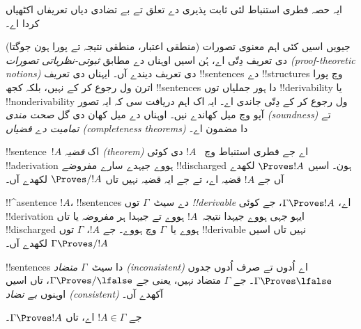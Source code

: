 \documentclass[../../../include/open-logic-section]{subfiles}
\begin{document}
      {}
      {}


\begin{editorial}
ایہ حصہ فطری استنباط لئی ثابت پذیری دے تعلق تے بے تضادی دیاں
تعریفاں اکٹھیاں کردا اے۔
\end{editorial}

\begin{explain}
جیویں اسیں کئی اہم معنوی تصورات (منطقی اعتبار، منطقی نتیجہ تے پورا ہون
جوگتا) دی تعریف دِتّی اے، ہُن اسیں اوہناں دے مطابق
\emph{ثبوتی-نظریاتی تصورات (proof-theoretic notions)} دی تعریف دیندے آں۔
ایہناں دی تعریف !!{sentence}s دے !!{structure}s وچ پورا اترن ول رجوع کر کے
نہیں، بلکہ کجھ !!{sentence}s دا ہور جملیاں توں !!{derivability}
یا !!{nonderivability} ول رجوع کر کے دِتّی جاندی اے۔ ایہ اک اہم دریافت سی
کہ ایہ تصور آپو وچ میل کھاندے نیں۔ اوہناں دے میل کھان دی گل
\emph{صحت مندی (soundness)} تے \emph{تمامیت دے قضیاں (completeness theorems)}
دا مضمون اے۔
\end{explain}


\begin{defn}
!!{sentence}~$!A$ اک \emph{قضیہ (theorem)} اے جے فطری استنباط وچ
~$!A$ دی کوئی !!a{derivation} ہووے جیہدے سارے مفروضے !!{discharged} ہون۔
اسیں $\Proves !A$ لکھدے آں جے $!A$ قضیہ اے، تے جے ایہ قضیہ نہیں تاں
$\Proves/ !A$ لکھدے آں۔
\end{defn}

\begin{defn}[!!^{derivability}]
!!^a{sentence} $!A$، !!{sentence}s دے سیٹ~$\Gamma$ توں
\emph{!!{derivable}} اے، $\Gamma \Proves !A$، جے کوئی
!!{derivation} ایہو جہی ہووے جیہدا نتیجہ~$!A$ ہووے تے جیہدا ہر مفروضہ
یا تاں !!{discharged} ہووے یا~$\Gamma$ وچ ہووے۔ جے $!A$، $\Gamma$ توں
!!{derivable} نہیں تاں اسیں $\Gamma \Proves/ !A$ لکھدے آں۔
\end{defn}

\begin{defn}
!!{sentence}s دا سیٹ~$\Gamma$ \emph{متضاد (inconsistent)} اے اُدوں تے صرف
اُدوں جدوں $\Gamma
\Proves \lfalse$۔ جے $\Gamma$ متضاد نہیں، یعنی جے
$\Gamma \Proves/ \lfalse$، تاں اسیں اوہنوں \emph{بے تضاد (consistent)}
آکھدے آں۔
\end{defn}

\begin{prop}
جے $!A \in \Gamma$ اے، تاں $\Gamma \Proves !A$۔
\end{prop}
\end{document}
